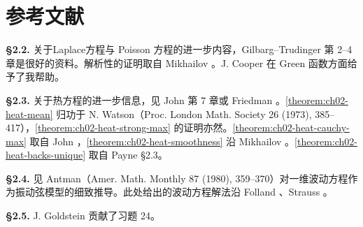 \documentclass[../../main.tex]{subfiles}
\begin{document}
\section{参考文献}\label{section:ch02-references}

\textbf{\S2.2.} 关于Laplace方程与 Poisson 方程的进一步内容，Gilbarg--Trudinger \cite{G-T} 第 2--4 章是很好的资料。解析性的证明取自 Mikhailov \cite{M}。J. Cooper 在 Green 函数方面给予了我帮助。

\textbf{\S2.3.} 关于热方程的进一步信息，见 John \cite{J2} 第 7 章或 Friedman \cite{Fr1}。\cref{theorem:ch02-heat-mean} 归功于 N. Watson（Proc. London Math. Society 26 (1973), 385--417），\cref{theorem:ch02-heat-strong-max} 的证明亦然。\cref{theorem:ch02-heat-cauchy-max} 取自 John \cite{J2}，\cref{theorem:ch02-heat-smoothness} 沿 Mikhailov \cite{M}。\cref{theorem:ch02-heat-backs-unique} 取自 Payne \cite{Pa} \S2.3。

\textbf{\S2.4.} 见 Antman（Amer. Math. Monthly 87 (1980), 359--370）对一维波动方程作为振动弦模型的细致推导。此处给出的波动方程解法沿 Folland \cite{F1}、Strauss \cite{St2}。

\textbf{\S2.5.} J. Goldstein 贡献了习题 24。
\end{document}

